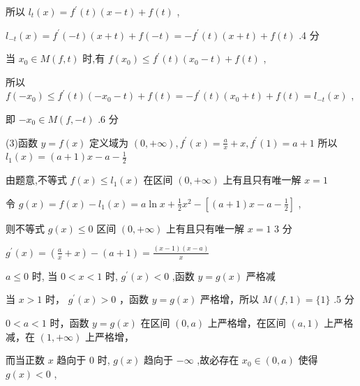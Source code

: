 \documentclass[10pt]{article}
\newcommand*\circled[1]{\tikz[baseline=(char.base)]{\node[shape=circle,draw,inner sep=1.5pt] (char) {\small #1};}}
\begin{document}
所以 \({l}_{t}\left( x\right)  = {f}^{\prime }\left( t\right) \left( {x - t}\right)  + f\left( t\right)\) ,

\({l}_{-t}\left( x\right)  = {f}^{\prime }\left( {-t}\right) \left( {x + t}\right)  + f\left( {-t}\right)  =  - {f}^{\prime }\left( t\right) \left( {x + t}\right)  + f\left( t\right)\) .4 分

当 \({x}_{0} \in  M\left( {f,t}\right)\) 时,有 \(f\left( {x}_{0}\right)  \leq  {f}^{\prime }\left( t\right) \left( {{x}_{0} - t}\right)  + f\left( t\right)\) ,

所以 \(f\left( {-{x}_{0}}\right)  \leq  {f}^{\prime }\left( t\right) \left( {-{x}_{0} - t}\right)  + f\left( t\right)  =  - {f}^{\prime }\left( t\right) \left( {{x}_{0} + t}\right)  + f\left( t\right)  = {l}_{-t}\left( x\right)\) ,

即 \(- {x}_{0} \in  M\left( {f, - t}\right)\) .6 分

(3)函数 \(y = f\left( x\right)\) 定义域为 \(\left( {0, + \infty }\right) ,{f}^{\prime }\left( x\right)  = \frac{a}{x} + x,{f}^{\prime }\left( 1\right)  = a + 1\) 所以 \({l}_{1}\left( x\right)  = \left( {a + 1}\right) x - a - \frac{1}{2}\)

由题意,不等式 \(f\left( x\right)  \leq  {l}_{1}\left( x\right)\) 在区间 \(\left( {0, + \infty }\right)\) 上有且只有唯一解 \(x = 1\)

令 \(g\left( x\right)  = f\left( x\right)  - {l}_{1}\left( x\right)  = a\ln x + \frac{1}{2}{x}^{2} - \left\lbrack  {\left( {a + 1}\right) x - a - \frac{1}{2}}\right\rbrack\) ,

则不等式 \(g\left( x\right)  \leq  0\) 区间 \(\left( {0, + \infty }\right)\) 上有且只有唯一解 \(x = 1\) 3 分

\({g}^{\prime }\left( x\right)  = \left( {\frac{a}{x} + x}\right)  - \left( {a + 1}\right)  = \frac{\left( {x - 1}\right) \left( {x - a}\right) }{x}\)

\(a \leq  0\) 时, \circled{1}  当 \(0 < x < 1\) 时, \({g}^{\prime }\left( x\right)  < 0\) ,函数 \(y = g\left( x\right)\) 严格减

 \circled{2}  当 \(x > 1\) 时， \({g}^{\prime }\left( x\right)  > 0\) ，函数 \(y = g\left( x\right)\) 严格增，所以 \(M\left( {f,1}\right)  = \{ 1\}\) .5 分

\(0 < a < 1\) 时，函数 \(y = g\left( x\right)\) 在区间 \(\left( {0,a}\right)\) 上严格增，在区间 \(\left( {a,1}\right)\) 上严格减，在 \(\left( {1, + \infty }\right)\) 上严格增，

而当正数 \(x\) 趋向于 0 时, \(g\left( x\right)\) 趋向于 \(- \infty\) ,故必存在 \({x}_{0} \in  \left( {0,a}\right)\) 使得 \(g\left( x\right)  < 0\) ,
\end{document}
